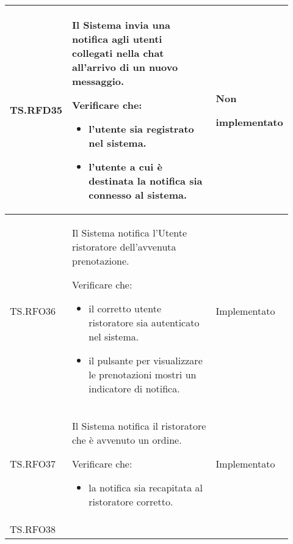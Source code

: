 \begin{longtable}{|p{0.10\linewidth}|p{0.70\linewidth}|p{0.12\linewidth}|}
	\hline
	TS.RFD35                                                                                                                        &
	Il Sistema invia una notifica agli utenti collegati nella chat all'arrivo di un nuovo messaggio. \par
	Verificare che:
	\begin{itemize}
		\item l'utente sia registrato nel sistema.
		\item l'utente a cui è destinata la notifica sia connesso al sistema.
	\end{itemize}                                                           &
	Non \par implementato                                                                                                                                                   \\
	\hline
	TS.RFO36                                                                                                                        &
	Il Sistema notifica l'Utente ristoratore dell'avvenuta prenotazione.  \par
	Verificare che:
	\begin{itemize}
		\item il corretto utente ristoratore sia autenticato nel sistema.
		\item il pulsante per visualizzare le prenotazioni mostri un indicatore di notifica.
	\end{itemize}                                            &
	Implementato                                                                                                                                                   \\
	\hline
	TS.RFO37                                                                                                                        &
	Il Sistema notifica il ristoratore che è avvenuto un ordine.   \par
	Verificare che:
	\begin{itemize}
		\item la notifica sia recapitata al ristoratore corretto.
	\end{itemize}                                                                       &
	Implementato                                                                                                                                                   \\
	\hline
	TS.RFO38                                                                                                                        &

\end{longtable}
